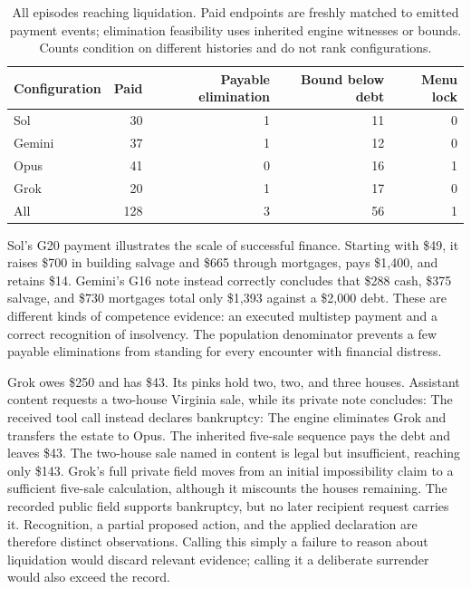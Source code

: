 \begin{table}[t]
\centering\small
\begin{tabular}{@{}lrrrr@{}}\toprule
Configuration & Paid & Payable elimination & Bound below debt & Menu lock\\\midrule
Sol & 30 & 1 & 11 & 0\\
Gemini & 37 & 1 & 12 & 0\\
Opus & 41 & 0 & 16 & 1\\
Grok & 20 & 1 & 17 & 0\\\midrule
All & 128 & 3 & 56 & 1\\\bottomrule
\end{tabular}
\caption{All episodes reaching liquidation. Paid endpoints are freshly matched to emitted payment events; elimination feasibility uses inherited engine witnesses or bounds. Counts condition on different histories and do not rank configurations.}
\label{tab:debts}
\end{table}

Sol's G20 payment illustrates the scale of successful finance. Starting with \$49, it raises \$700 in building salvage and \$665 through mortgages, pays \$1,400, and retains \$14. Gemini's G16 note instead correctly concludes that \$288 cash, \$375 salvage, and \$730 mortgages total only \$1,393 against a \$2,000 debt. These are different kinds of competence evidence: an executed multistep payment and a correct recognition of insolvency. The population denominator prevents a few payable eliminations from standing for every encounter with financial distress.


Grok owes \$250 and has \$43. Its pinks hold two, two, and three houses. Assistant content requests a two-house Virginia sale, while its private note concludes:
The received tool call instead declares bankruptcy:
The engine eliminates Grok and transfers the estate to Opus. The inherited five-sale sequence pays the debt and leaves \$43. The two-house sale named in content is legal but insufficient, reaching only \$143. Grok's full private field moves from an initial impossibility claim to a sufficient five-sale calculation, although it miscounts the houses remaining. The recorded public field supports bankruptcy, but no later recipient request carries it. Recognition, a partial proposed action, and the applied declaration are therefore distinct observations. Calling this simply a failure to reason about liquidation would discard relevant evidence; calling it a deliberate surrender would also exceed the record.

